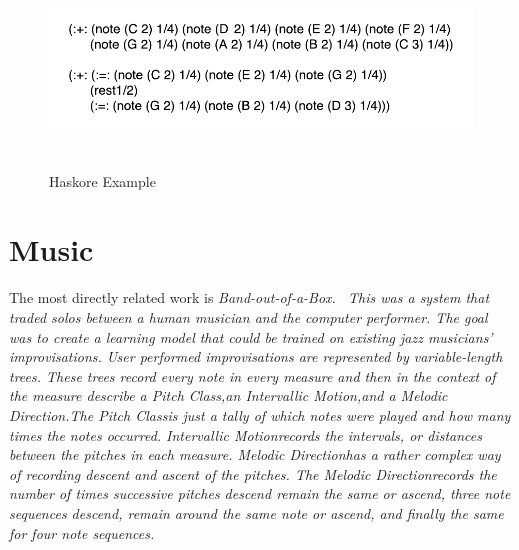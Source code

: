 \documentclass[12pt]{ucthesis}
\newcommand{\captionfonts}{\small\bf\ssp}
\begin{document}
\begin{figure}
\includegraphics[height=45mm]{haskore-example.pdf}
\captionfonts
\caption[Haskore Example]{Haskore Example}
\label{fig:haskore-example}
\end{figure}

\section{Music}
\label{rw:music}
The most directly related work is \em{Band-out-of-a-Box}\em.~\cite{bob} This was a system that traded solos between a human musician and the computer performer. The goal was to create a learning model that could be trained on existing jazz musicians' improvisations. User performed improvisations are represented by variable-length trees. These trees record every note in every measure and then in the context of the measure describe a \em{Pitch Class,}\em an \em{Intervallic Motion,}\em and a \em{Melodic Direction.}\em The \em{Pitch Class}\em is just a tally of which notes were played and how many times the notes occurred. \em{Intervallic Motion}\em records the intervals, or distances between the pitches in each measure.  \em{Melodic Direction}\em has a rather complex way of recording descent and ascent of the pitches.  The \em{Melodic Direction}\em records the number of times successive pitches descend remain the same or ascend, three note sequences descend, remain around the same note or ascend, and finally the same for four note sequences. 
\end{document}
